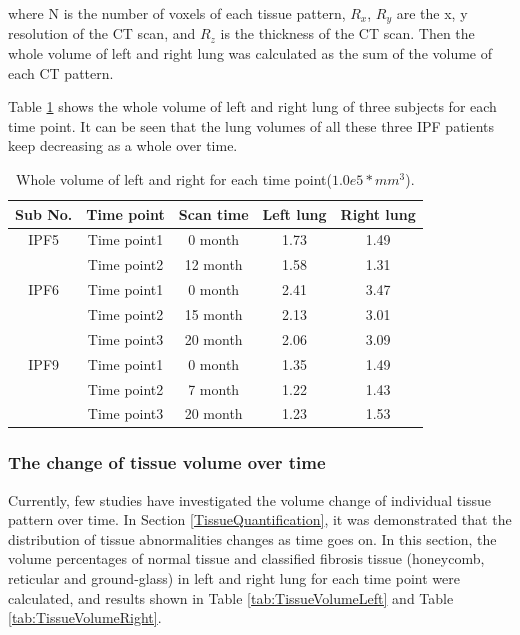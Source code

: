 \noindent where N is the number of voxels of each tissue pattern, $R_{x}$, $R_{y}$ are the x, y resolution of the CT scan, and $R_{z}$ is the thickness of the CT scan. Then the whole volume of left and right lung was calculated as the sum of the volume of each CT pattern.

Table \ref{tab:WholeVolume} shows the whole volume of left and right lung of three subjects for each time point. It can be seen that the lung volumes of all these three IPF patients keep decreasing as a whole over time. 

\begin{table}[htbp]
\centering
\caption{Whole volume of left and right for each time point($1.0e 5 \ast mm^{3}$).}
\label{tab:WholeVolume}
\begin{tabular}{c c c c c}
\hline
\bf{Sub No.} & \bf{Time point} & \bf{Scan time}	& \bf{Left lung} &	\bf{Right lung}\\ 
\hline
IPF5 & Time point1 &  0 month & 1.73 & 1.49\\
\quad & Time point2 & 12 month & 1.58 & 1.31\\
\hline
IPF6 & Time point1 &	0 month &	2.41 &	3.47\\
\quad & Time point2 &	15 month &	2.13 &	3.01\\
\quad & Time point3 &	20 month &	2.06 &	3.09\\
\hline
IPF9 & Time point1 &	0 month &	1.35 &	1.49\\
\quad & Time point2 &	7 month &	1.22 &	1.43\\
\quad & Time point3 &	20 month &	1.23 &	1.53\\
\hline
\end{tabular}
\end{table}

\subsubsection{The change of tissue volume over time}
Currently, few studies have investigated the volume change of individual tissue pattern over time. In Section \ref{TissueQuantification}, it was demonstrated that the distribution of tissue abnormalities changes as time goes on. In this section, the volume percentages of normal tissue and classified fibrosis tissue (honeycomb, reticular and ground-glass) in left and right lung for each time point were calculated, and  results shown in Table \ref{tab:TissueVolumeLeft} and Table \ref{tab:TissueVolumeRight}.

